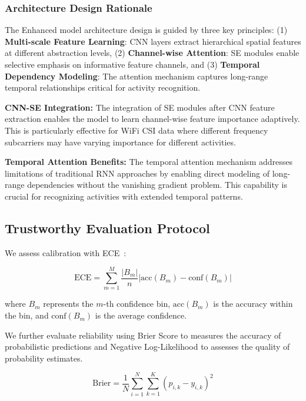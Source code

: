 \documentclass[journal]{IEEEtran}
\begin{document}
\subsubsection{Architecture Design Rationale}

The Enhanced model architecture design is guided by three key principles: (1) \textbf{Multi-scale Feature Learning}: CNN layers extract hierarchical spatial features at different abstraction levels, (2) \textbf{Channel-wise Attention}: SE modules enable selective emphasis on informative feature channels, and (3) \textbf{Temporal Dependency Modeling}: The attention mechanism captures long-range temporal relationships critical for activity recognition.

\textbf{CNN-SE Integration:} The integration of SE modules after CNN feature extraction enables the model to learn channel-wise feature importance adaptively. This is particularly effective for WiFi CSI data where different frequency subcarriers may have varying importance for different activities.

\textbf{Temporal Attention Benefits:} The temporal attention mechanism addresses limitations of traditional RNN approaches by enabling direct modeling of long-range dependencies without the vanishing gradient problem. This capability is crucial for recognizing activities with extended temporal patterns.

\subsection{Trustworthy Evaluation Protocol}

We assess calibration with ECE~\cite{calibration_guo2017}:

\begin{equation}
\text{ECE} = \sum_{m=1}^{M} \frac{|B_m|}{n} |\text{acc}(B_m) - \text{conf}(B_m)|
\end{equation}

where $B_m$ represents the $m$-th confidence bin, $\text{acc}(B_m)$ is the accuracy within the bin, and $\text{conf}(B_m)$ is the average confidence.

We further evaluate reliability using Brier Score to measures the accuracy of probabilistic predictions and Negative Log-Likelihood to assesses the quality of probability estimates.

\begin{equation}
\text{Brier} = \frac{1}{N} \sum_{i=1}^{N} \sum_{k=1}^{K} (p_{i,k} - y_{i,k})^2
\end{equation}
\end{document}
